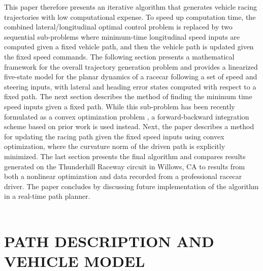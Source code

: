 \documentclass[twocolumn,10pt, final]{asme2e}
\begin{document}
 This paper therefore presents an iterative algorithm that generates vehicle racing trajectories with low computational expense. 
 To speed up computation time, the combined lateral/longitudinal optimal control problem is replaced by two sequential sub-problems 
 where minimum-time longitudinal speed inputs are computed given a fixed vehicle path, and then the vehicle path is updated given the fixed speed commands. The following section presents a mathematical framework for the overall trajectory generation
 problem and provides a linearized five-state model for the planar dynamics of a racecar following a set of speed and steering inputs, with lateral and heading error states computed with respect to a fixed path.
 The next section describes the method of finding the minimum time speed inputs given a fixed path.  While this sub-problem has been recently formulated as a convex optimization problem \cite{lipp}, a forward-backward
 integration scheme based on prior work \cite{subosits} is used instead.  Next, the paper describes a method for updating the racing path given the fixed speed inputs using convex optimization, where the curvature norm
 of the driven path is explicitly minimized. The last section presents the final algorithm and compares results generated on the Thunderhill Raceway circuit
 in Willows, CA to results from both a nonlinear optimization and data recorded from a professional racecar driver. The paper concludes by discussing 
 future implementation of the algorithm in a real-time path planner.  
\\\\
\section*{PATH DESCRIPTION AND VEHICLE MODEL}
\end{document}
